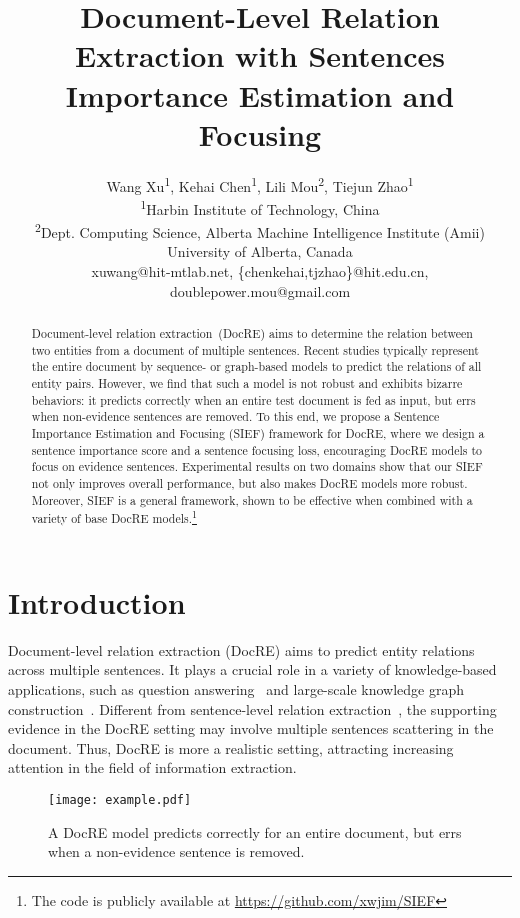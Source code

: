 \documentclass[11pt]{article}
\title{Document-Level Relation Extraction with Sentences Importance Estimation and Focusing}
\author{Wang Xu\textsuperscript{\rm 1}, Kehai Chen\textsuperscript{\rm 1}, Lili Mou\textsuperscript{\rm 2}, Tiejun Zhao\textsuperscript{\rm 1} \\
  \textsuperscript{\rm 1}Harbin Institute of Technology, China \\
  \textsuperscript{\rm 2}Dept. Computing Science, Alberta Machine Intelligence Institute (Amii)\\
  University of Alberta, Canada \\
  xuwang@hit-mtlab.net, \{chenkehai,tjzhao\}@hit.edu.cn, doublepower.mou@gmail.com\\}
\begin{document}
\maketitle
\begin{abstract}
Document-level relation extraction~(DocRE) aims to determine the relation between two entities from a document of multiple sentences.
Recent studies typically represent the entire document by sequence- or graph-based models to predict the relations of all entity pairs. However, we find that such a model is not robust and exhibits bizarre behaviors: it predicts correctly when an entire test document is fed as input, but errs when non-evidence sentences are removed. To this end, we propose a Sentence Importance Estimation and Focusing (SIEF) framework for DocRE, where we design a sentence importance score and a sentence focusing loss, encouraging DocRE models to focus on evidence sentences. Experimental results on two domains show that our SIEF not only improves overall performance, but also makes DocRE models more robust. Moreover, SIEF is a general framework, shown to be effective when combined with a variety of base DocRE models.\footnote{The code is publicly available at \url{https://github.com/xwjim/SIEF}}
\end{abstract}

\section{Introduction}
\label{sec1}

Document-level relation extraction (DocRE) aims to predict entity relations across multiple sentences. It plays a crucial role in a variety of knowledge-based applications, such as question answering~\cite{sorokin-gurevych-2017-context} and large-scale knowledge graph construction~\cite{baldini-soares-etal-2019-matching}.
Different from sentence-level relation extraction~\cite{zeng-etal-2014-relation,xiao-liu-2016-semantic,Song_2019}, the supporting evidence in the DocRE setting may involve multiple sentences scattering in the document. 
Thus, DocRE is more a realistic setting, attracting increasing attention in the field of information extraction.

\begin{figure}[t!]
  \centering
  \texttt{[image: example.pdf]}
  \caption{A DocRE model predicts correctly for an entire document, but errs when a non-evidence sentence is removed.}
  \label{fig1:example}
\end{figure}
\end{document}
